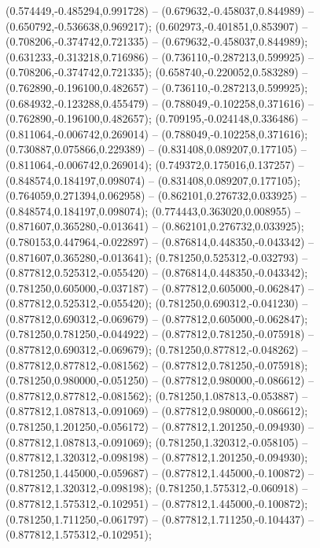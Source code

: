  (0.574449,-0.485294,0.991728) -- (0.679632,-0.458037,0.844989) -- (0.650792,-0.536638,0.969217);
 (0.602973,-0.401851,0.853907) -- (0.708206,-0.374742,0.721335) -- (0.679632,-0.458037,0.844989);
 (0.631233,-0.313218,0.716986) -- (0.736110,-0.287213,0.599925) -- (0.708206,-0.374742,0.721335);
 (0.658740,-0.220052,0.583289) -- (0.762890,-0.196100,0.482657) -- (0.736110,-0.287213,0.599925);
 (0.684932,-0.123288,0.455479) -- (0.788049,-0.102258,0.371616) -- (0.762890,-0.196100,0.482657);
 (0.709195,-0.024148,0.336486) -- (0.811064,-0.006742,0.269014) -- (0.788049,-0.102258,0.371616);
 (0.730887,0.075866,0.229389) -- (0.831408,0.089207,0.177105) -- (0.811064,-0.006742,0.269014);
 (0.749372,0.175016,0.137257) -- (0.848574,0.184197,0.098074) -- (0.831408,0.089207,0.177105);
 (0.764059,0.271394,0.062958) -- (0.862101,0.276732,0.033925) -- (0.848574,0.184197,0.098074);
 (0.774443,0.363020,0.008955) -- (0.871607,0.365280,-0.013641) -- (0.862101,0.276732,0.033925);
 (0.780153,0.447964,-0.022897) -- (0.876814,0.448350,-0.043342) -- (0.871607,0.365280,-0.013641);
 (0.781250,0.525312,-0.032793) -- (0.877812,0.525312,-0.055420) -- (0.876814,0.448350,-0.043342);
 (0.781250,0.605000,-0.037187) -- (0.877812,0.605000,-0.062847) -- (0.877812,0.525312,-0.055420);
 (0.781250,0.690312,-0.041230) -- (0.877812,0.690312,-0.069679) -- (0.877812,0.605000,-0.062847);
 (0.781250,0.781250,-0.044922) -- (0.877812,0.781250,-0.075918) -- (0.877812,0.690312,-0.069679);
 (0.781250,0.877812,-0.048262) -- (0.877812,0.877812,-0.081562) -- (0.877812,0.781250,-0.075918);
 (0.781250,0.980000,-0.051250) -- (0.877812,0.980000,-0.086612) -- (0.877812,0.877812,-0.081562);
 (0.781250,1.087813,-0.053887) -- (0.877812,1.087813,-0.091069) -- (0.877812,0.980000,-0.086612);
 (0.781250,1.201250,-0.056172) -- (0.877812,1.201250,-0.094930) -- (0.877812,1.087813,-0.091069);
 (0.781250,1.320312,-0.058105) -- (0.877812,1.320312,-0.098198) -- (0.877812,1.201250,-0.094930);
 (0.781250,1.445000,-0.059687) -- (0.877812,1.445000,-0.100872) -- (0.877812,1.320312,-0.098198);
 (0.781250,1.575312,-0.060918) -- (0.877812,1.575312,-0.102951) -- (0.877812,1.445000,-0.100872);
 (0.781250,1.711250,-0.061797) -- (0.877812,1.711250,-0.104437) -- (0.877812,1.575312,-0.102951);
